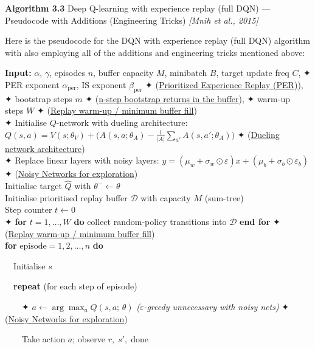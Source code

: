 \documentclass[11pt]{article}
\begin{document}
    \begin{pseudobox}

\textbf{Algorithm 3.3} Deep Q-learning with experience replay (full DQN)
--- Pseudocode with Additions (Engineering Tricks) \emph{{[}Mnih et al.,
2015{]}}

\tcbline

Here is the pseudocode for the DQN with experience replay (full DQN)
algorithm with also employing all of the additions and engineering
tricks mentioned above:

\textbf{Input:} \(\alpha\), \(\gamma\), episodes \(n\), buffer capacity
\(M\), minibatch \(B\), target update freq \(C\), ✦ PER exponent
\(\alpha_\text{per}\), IS exponent \(\beta_\text{per}\) ✦
(\hyperref[trick-3-3-1]{Prioritized Experience Replay (PER)}), ✦
bootstrap steps \(m\) ✦ (\hyperref[trick-3-3-5]{n-step bootstrap returns
in the buffer}), ✦ warm-up steps \(W\) ✦ (\hyperref[trick-3-3-8]{Replay
warm-up / minimum buffer fill})\\
✦ Initialise \(Q\)-network with dueling architecture:
\(Q(s,a) = V(s;\theta_V) + \bigl(A(s,a;\theta_A) - \tfrac{1}{|A|}\sum_{a'}A(s,a';\theta_A)\bigr)\)
✦ (\hyperref[trick-3-3-3]{Dueling network architecture})\\
✦ Replace linear layers with noisy layers:
\(y = (\mu_w + \sigma_w \odot \varepsilon)x + (\mu_b + \sigma_b \odot \varepsilon_b)\)
✦ (\hyperref[trick-3-3-4]{Noisy Networks for exploration})\\
Initialise target \(\hat{Q}\) with \(\theta^{-} \leftarrow \theta\)\\
Initialise prioritised replay buffer \(\mathcal{D}\) with capacity \(M\)
(sum-tree)\\
Step counter \(t \leftarrow 0\)\\
✦ \textbf{for} \(t = 1, \ldots, W\) \textbf{do} collect random-policy
transitions into \(\mathcal{D}\) \textbf{end for} ✦
(\hyperref[trick-3-3-8]{Replay warm-up / minimum buffer fill})\\
\textbf{for} \(\text{episode} = 1, 2, \ldots, n\) \textbf{do}\\
\strut ~~Initialise \(s\)\\
\strut ~~\textbf{repeat} (for each step of episode)\\
\strut ~~~~✦ \(a \leftarrow \arg\max_a Q(s, a;\, \theta)\)
\emph{(\(\varepsilon\)-greedy unnecessary with noisy nets)} ✦
(\hyperref[trick-3-3-4]{Noisy Networks for exploration})\\
\strut ~~~~Take action \(a\); observe \(r,\; s',\; \text{done}\)\\

\end{pseudobox}
\end{document}
